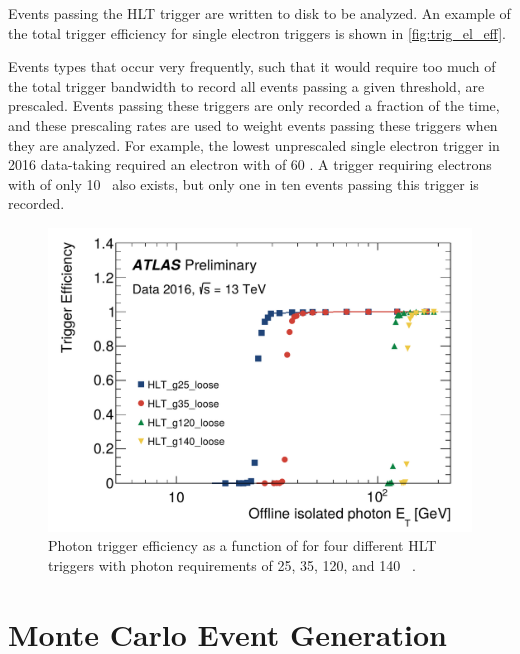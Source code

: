 Events passing the \ac{HLT} trigger are written to disk to be analyzed. An example of the total trigger efficiency for single electron triggers is shown in \autoref{fig:trig_el_eff}. %

Events types that occur very frequently, such that it would require too much of the total trigger bandwidth to record all events passing a given threshold, are prescaled. Events passing these triggers are only recorded a fraction of the time, and these prescaling rates are used to weight events passing these triggers when they are analyzed. For example, the lowest unprescaled single electron trigger in 2016 data-taking required an electron with \pt of 60 \gev. A trigger requiring electrons with \pt of only 10 \gev~also exists, but only one in ten events passing this trigger is recorded. 

\begin{centering}
\begin{figure}[!hbt]
\myfloatalign
\includegraphics[width=.90\linewidth]{figures/atlas/plot_Combined_Pt_LOGaxis_Et_log_25l_35l_120l_140l.pdf}
\caption{Photon trigger efficiency as a function of \et for four different \ac{HLT} triggers with photon \pt requirements of 25, 35, 120, and 140 \gev~\cite{egamma_trig}.}
\label{fig:trig_el_eff}
\end{figure}
\end{centering}


\section{Monte Carlo Event Generation}
\label{sec:MC_gen}

